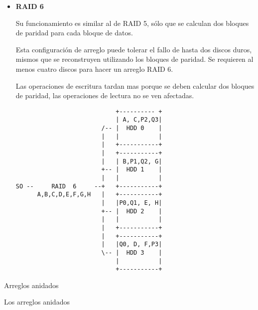 \begin{itemize}
  \item \textbf{RAID 6}

Su funcionamiento es similar al de \textsc{RAID} 5, s\'{o}lo que se calculan dos bloques de paridad para cada bloque de datos.

Esta configuraci\'{o}n de arreglo puede tolerar el fallo de hasta dos discos duros, mismos que se reconstruyen utilizando los bloques de paridad. Se requieren al menos cuatro discos para hacer un arreglo \textsc{RAID} 6.

Las operaciones de escritura tardan mas porque se deben calcular dos bloques de paridad, las operaciones de lectura no se ven afectadas.

{
\scriptsize
\linespread{1}
\begin{verbatim}
                            +---------- +
                            | A, C,P2,Q3|
                        /-- |  HDD 0    |
                        |   |           |
                        |   +-----------+
                        |   +-----------+
                        |   | B,P1,Q2, G|
                        +-- |  HDD 1    |
                        |   |           |
SO --     RAID  6     --+   +-----------+
      A,B,C,D,E,F,G,H   |   +-----------+
                        |   |P0,Q1, E, H|
                        +-- |  HDD 2    |
                        |   |           |
                        |   +-----------+
                        |   +-----------+
                        |   |Q0, D, F,P3|
                        \-- |  HDD 3    |
                            |           |
                            +-----------+
\end{verbatim}
}

\end{itemize}

Arreglos anidados

Los arreglos anidados \cite{_intro_????}

